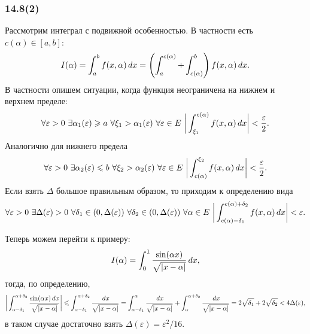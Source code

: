 \subsubsection*{14.8(2)}

Рассмотрим интеграл с подвижной особенностью. В частности есть $c(\alpha) \in [a, b]$:
\begin{equation*}
    I(\alpha) = \int_{a}^{b} f(x, \alpha) \, d x = 
    \left(\int_{a}^{c(\alpha)} + \int_{c(\alpha)}^{b} \right)
    f(x, \alpha) \, d x.
\end{equation*}
В частности опишем ситуации, когда функция неограничена на нижнем и верхнем пределе:
\begin{equation*}
    \forall \varepsilon > 0 \ 
    \exists \alpha_1(\varepsilon) \geq a \
    \forall \xi_1 > \alpha_1(\varepsilon) \ 
    \forall \varepsilon \in E \ 
    \bigg| \int_{\xi_1}^{c(\alpha)}f(x, \alpha) \d x \bigg| < \frac{\varepsilon}{2}.
\end{equation*}
Аналогично для нижнего предела
\begin{equation*}
    \forall \varepsilon > 0 \ 
    \exists \alpha_2(\varepsilon) \leq b \
    \forall \xi_2 > \alpha_2(\varepsilon) \ 
    \forall \varepsilon \in E \ 
    \bigg| \int_{c(\alpha)}^{\xi_2}f(x, \alpha) \d x \bigg| < \frac{\varepsilon}{2}.
\end{equation*}
Если взять $\Delta$ большое правильным образом, то приходим к определению вида
\begin{equation*}
    \forall \varepsilon > 0 \ 
    \exists \Delta(\varepsilon) > 0 \ 
    \forall \delta_1 \in (0, \Delta(\varepsilon)) \ 
    \forall \delta_2 \in (0, \Delta(\varepsilon)) \
    \forall \alpha \in E \ 
    \bigg| \int_{c(\alpha)-\delta_1}^{c(\alpha)+\delta_2}f(x, \alpha) \d x \bigg| < \varepsilon.
\end{equation*}

Теперь можем перейти к примеру:
\begin{equation*}
    I(\alpha) = \int_0^1 \frac{\sin(\alpha x)}{\sqrt{|x-\alpha|}} \, d x,
\end{equation*}
тогда, по определению,
\begin{equation*}
    \bigg| \int_{\alpha-\delta_1}^{\alpha+\delta_2} 
    \frac{\sin(\alpha x) \, d x}{\sqrt{|x-\alpha|}}
    \bigg| \leqslant \int_{\alpha-\delta_1}^{\alpha+\delta_2} \frac{\, d x}{\sqrt{|x-\alpha|}} = 
    \int_{\alpha-\delta_1}^{\alpha} \frac{\, d x}{\sqrt{|x-\alpha|}}  + 
    \int_{\alpha}^{\alpha+\delta_2} \frac{\, d x}{\sqrt{|x-\alpha|}} = 
    2\sqrt{\delta_1} + 2 \sqrt{\delta_2} < 4 \Delta(\varepsilon),
\end{equation*}
в таком случае достаточно взять $\Delta(\varepsilon) = \varepsilon^2/16$. 



